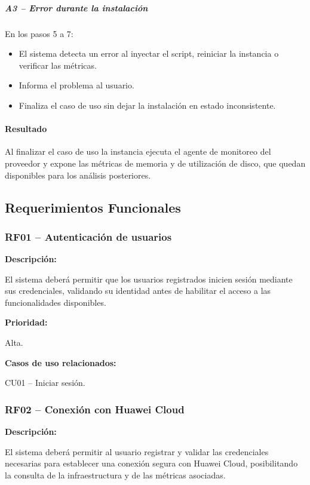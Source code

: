 \subparagraph{A3 -- Error durante la instalación}

En los pasos 5 a 7:

\begin{itemize}
\item El sistema detecta un error al inyectar el script, reiniciar la instancia o verificar las métricas.
\item Informa el problema al usuario.
\item Finaliza el caso de uso sin dejar la instalación en estado inconsistente.
\end{itemize}

\paragraph*{Resultado}

Al finalizar el caso de uso la instancia ejecuta el agente de monitoreo del proveedor y expone las métricas de memoria y de utilización de disco, que quedan disponibles para los análisis posteriores.

\subsection{Requerimientos Funcionales}

\subsubsection{RF01 -- Autenticación de usuarios}

\noindent \textbf{Descripción:}

El sistema deberá permitir que los usuarios registrados inicien sesión mediante sus credenciales, validando su identidad antes de habilitar el acceso a las funcionalidades disponibles.

\noindent \textbf{Prioridad:}

Alta.

\noindent \textbf{Casos de uso relacionados:}

\noindent CU01 -- Iniciar sesión.

\subsubsection{RF02 -- Conexión con Huawei Cloud}

\noindent \textbf{Descripción:}

El sistema deberá permitir al usuario registrar y validar las credenciales necesarias para establecer una conexión segura con Huawei Cloud, posibilitando la consulta de la infraestructura y de las métricas asociadas.

